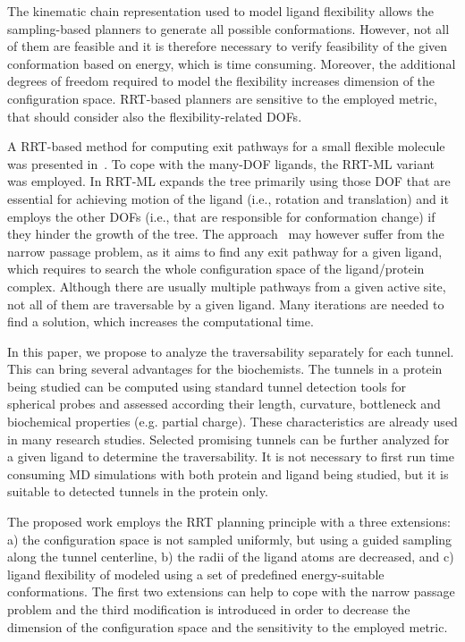 \documentclass{svmult}
\begin{document}
The kinematic chain representation used to model ligand flexibility allows the sampling-based planners to generate all possible conformations.
However, not all of them are feasible and it is therefore necessary to verify feasibility of the given conformation based on energy, which is time consuming.
Moreover, the additional degrees of freedom required to model the flexibility increases dimension of the configuration space.
RRT-based planners are sensitive to the employed metric, that should consider also the flexibility-related DOFs.

A RRT-based method for computing exit pathways for a small flexible molecule was presented in~\cite{cortes2010simulating}.
To cope with the many-DOF ligands, the RRT-ML variant~\cite{cortes2007mlrrt} was employed.
In RRT-ML expands the tree primarily using those DOF that are essential for achieving motion of the ligand (i.e., rotation
and translation) and it employs the other DOFs (i.e., that are responsible for conformation change) if they hinder the growth of the tree.
The approach~\cite{cortes2010simulating} may however suffer from the narrow passage problem, as it aims to find any exit pathway for a given ligand, which requires to search the whole configuration space of the ligand/protein complex.
Although there are usually multiple pathways from a given active site, not all of them are traversable by a given ligand.
Many iterations are needed to find a solution, which increases the computational time.

In this paper, we propose to analyze the traversability separately for each tunnel.
This can bring several advantages for the biochemists.
The tunnels in a protein being studied can be computed using standard tunnel detection tools for spherical probes and assessed
according their length, curvature, bottleneck and biochemical properties (e.g. partial charge).
These characteristics are already used in many research studies.
Selected promising tunnels can be further analyzed for a given ligand to determine the traversability.
It is not necessary to first run time consuming MD simulations with both protein and ligand being studied, but it is suitable
to detected tunnels in the protein only.

The proposed work employs the RRT planning principle with a three extensions: 
a) the configuration space is not sampled uniformly, but using a guided sampling along the tunnel centerline,
b) the radii of the ligand atoms are decreased, and 
c) ligand flexibility of modeled using a set of predefined energy-suitable conformations.
The first two extensions can help to cope with the narrow passage problem and the third modification
is introduced in order to decrease the dimension of the configuration space and the sensitivity to the employed
metric.
\end{document}
